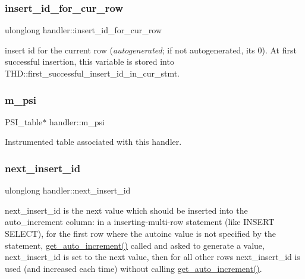\subsubsection{\texorpdfstring{insert\+\_\+id\+\_\+for\+\_\+cur\+\_\+row}{insert\_id\_for\_cur\_row}}
{\footnotesize\ttfamily ulonglong handler\+::insert\+\_\+id\+\_\+for\+\_\+cur\+\_\+row}

insert id for the current row ({\itshape autogenerated}; if not autogenerated, it\textquotesingle{}s 0). At first successful insertion, this variable is stored into T\+H\+D\+::first\+\_\+successful\+\_\+insert\+\_\+id\+\_\+in\+\_\+cur\+\_\+stmt. \mbox{\label{classhandler_a881e7cba3fe3bf9731a91be82983cc35}} 
\subsubsection{\texorpdfstring{m\+\_\+psi}{m\_psi}}
{\footnotesize\ttfamily P\+S\+I\+\_\+table$\ast$ handler\+::m\+\_\+psi}

Instrumented table associated with this handler. \mbox{\label{classhandler_a62ab295e407d8a5c50087fed0f4fcd18}} 
\subsubsection{\texorpdfstring{next\+\_\+insert\+\_\+id}{next\_insert\_id}}
{\footnotesize\ttfamily ulonglong handler\+::next\+\_\+insert\+\_\+id}

next\+\_\+insert\+\_\+id is the next value which should be inserted into the auto\+\_\+increment column\+: in a inserting-\/multi-\/row statement (like I\+N\+S\+E\+RT S\+E\+L\+E\+CT), for the first row where the autoinc value is not specified by the statement, \mbox{\hyperlink{classhandler_aaf6af760a4ef09984a5cc1dc58db9a40}{get\+\_\+auto\+\_\+increment()}} called and asked to generate a value, next\+\_\+insert\+\_\+id is set to the next value, then for all other rows next\+\_\+insert\+\_\+id is used (and increased each time) without calling \mbox{\hyperlink{classhandler_aaf6af760a4ef09984a5cc1dc58db9a40}{get\+\_\+auto\+\_\+increment()}}. \mbox{\label{classhandler_a64def328ff0ca7e391b217c2d3a758ec}} 
